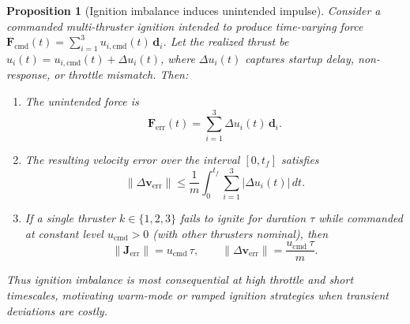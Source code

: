 \documentclass{article}
\newtheorem{proposition}{Proposition}
\begin{document}
\begin{proposition}[Ignition imbalance induces unintended impulse]
\label{prop:ignition_transient}
Consider a commanded multi-thruster ignition intended to produce time-varying force 
$\mathbf F_{\mathrm{cmd}}(t) = \sum_{i=1}^{3} u_{i,\mathrm{cmd}}(t)\,\mathbf d_i$.
Let the realized thrust be $u_i(t) = u_{i,\mathrm{cmd}}(t) + \Delta u_i(t)$, where 
$\Delta u_i(t)$ captures startup delay, non-response, or throttle mismatch. Then:

\begin{enumerate}
\item[\textup{(i)}] The unintended force is
\begin{equation}
\mathbf F_{\mathrm{err}}(t) = \sum_{i=1}^{3} \Delta u_i(t)\,\mathbf d_i.
\end{equation}

\item[\textup{(ii)}] The resulting velocity error over the interval $[0, t_f]$ satisfies
\begin{equation}
\|\Delta \mathbf v_{\mathrm{err}}\|
\le \frac{1}{m} \int_0^{t_f} \sum_{i=1}^{3} |\Delta u_i(t)|\,dt.
\label{eq:velocity_error_bound}
\end{equation}

\item[\textup{(iii)}] If a single thruster $k \in \{1,2,3\}$ fails to ignite for duration $\tau$ 
while commanded at constant level $u_{\mathrm{cmd}} > 0$ (with other thrusters nominal), then
\begin{equation}
\|\mathbf J_{\mathrm{err}}\| = u_{\mathrm{cmd}}\,\tau,
\qquad
\|\Delta \mathbf v_{\mathrm{err}}\| = \frac{u_{\mathrm{cmd}}\,\tau}{m}.
\label{eq:single_thruster_failure}
\end{equation}
\end{enumerate}
Thus ignition imbalance is most consequential at high throttle and short timescales, motivating 
warm-mode or ramped ignition strategies when transient deviations are costly.
\end{proposition}
\end{document}

